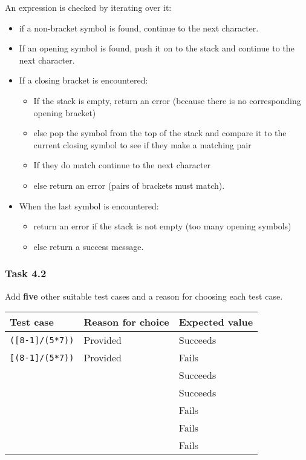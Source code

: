 An expression is checked by iterating over it: 
\begin{itemize}
\item if a non-bracket symbol is found, continue to the next character. 
\item If an opening symbol is found, push it on to the stack and continue
to the next character. 
\item If a closing bracket is encountered: 
\begin{itemize}
\item If the stack is empty, return an error (because there is no corresponding
opening bracket) 
\item else pop the symbol from the top of the stack and compare it to the
current closing symbol to see if they make a matching pair 
\item If they do match continue to the next character 
\item else return an error (pairs of brackets must match). 
\end{itemize}
\item When the last symbol is encountered: 
\begin{itemize}
\item return an error if the stack is not empty (too many opening symbols) 
\item else return a success message.
\end{itemize}
\end{itemize}

\subsubsection*{Task 4.2}

Add \textbf{five} other suitable test cases and a reason for choosing
each test case.
\begin{center}
\begin{tabular}{|l|l|l|}
\hline 
\hspace{0.05\columnwidth}\textbf{Test case} & \textbf{Reason for choice} & \textbf{Expected value}\tabularnewline
\hline 
\texttt{({[}8-1{]}/(5{*}7))} & Provided & Succeeds\tabularnewline
\hline 
\texttt{{[}(8-1{]}/(5{*}7))} & Provided & Fails\tabularnewline
\hline 
 &  & Succeeds\tabularnewline
\hline 
 &  & Succeeds\tabularnewline
\hline 
 &  & Fails\tabularnewline
\hline 
 &  & Fails\tabularnewline
\hline 
 &  & Fails\tabularnewline
\hline 
\end{tabular}
\par\end{center}

